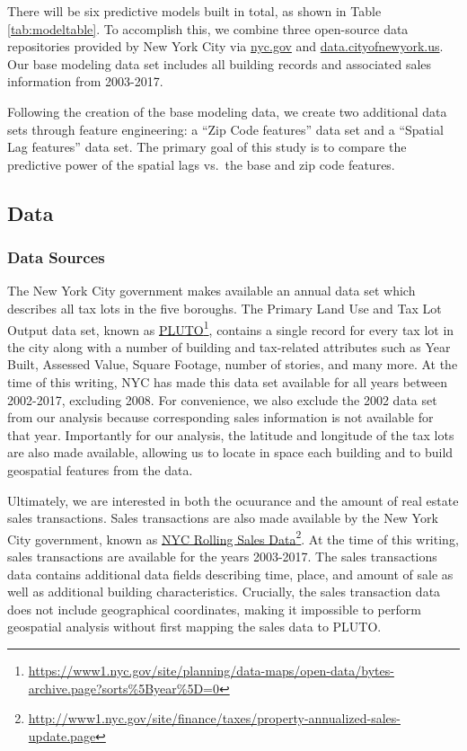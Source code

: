 \documentclass[12pt,]{article}
\let\rmarkdownfootnote\footnote%
\def\footnote{\protect\rmarkdownfootnote}
\begin{document}
\noindent There will be six predictive models built in total, as shown
in Table \ref{tab:modeltable}. To accomplish this, we combine three
open-source data repositories provided by New York City via
\url{nyc.gov} and \url{data.cityofnewyork.us}. Our base modeling data
set includes all building records and associated sales information from
2003-2017.

Following the creation of the base modeling data, we create two
additional data sets through feature engineering: a ``Zip Code
features'' data set and a ``Spatial Lag features'' data set. The primary
goal of this study is to compare the predictive power of the spatial
lags vs.~the base and zip code features.

\hypertarget{data}{%
\subsection{Data}\label{data}}

\hypertarget{data-sources}{%
\subsubsection{Data Sources}\label{data-sources}}

The New York City government makes available an annual data set which
describes all tax lots in the five boroughs. The Primary Land Use and
Tax Lot Output data set, known as
\href{https://www1.nyc.gov/site/planning/data-maps/open-data/bytes-archive.page?sorts\%5Byear\%5D=0}{PLUTO}\footnote{\url{https://www1.nyc.gov/site/planning/data-maps/open-data/bytes-archive.page?sorts\%5Byear\%5D=0}},
contains a single record for every tax lot in the city along with a
number of building and tax-related attributes such as Year Built,
Assessed Value, Square Footage, number of stories, and many more. At the
time of this writing, NYC has made this data set available for all years
between 2002-2017, excluding 2008. For convenience, we also exclude the
2002 data set from our analysis because corresponding sales information
is not available for that year. Importantly for our analysis, the
latitude and longitude of the tax lots are also made available, allowing
us to locate in space each building and to build geospatial features
from the data.

Ultimately, we are interested in both the ocuurance and the amount of
real estate sales transactions. Sales transactions are also made
available by the New York City government, known as
\href{http://www1.nyc.gov/site/finance/taxes/property-annualized-sales-update.page}{NYC
Rolling Sales Data}\footnote{\url{http://www1.nyc.gov/site/finance/taxes/property-annualized-sales-update.page}}.
At the time of this writing, sales transactions are available for the
years 2003-2017. The sales transactions data contains additional data
fields describing time, place, and amount of sale as well as additional
building characteristics. Crucially, the sales transaction data does not
include geographical coordinates, making it impossible to perform
geospatial analysis without first mapping the sales data to PLUTO.
\end{document}
